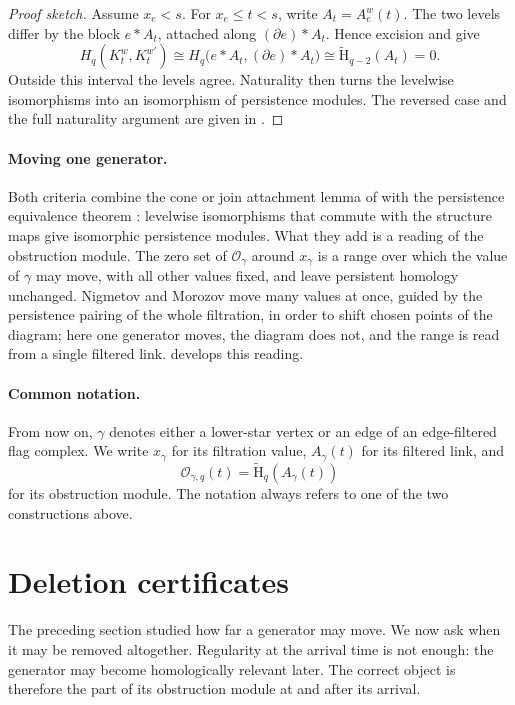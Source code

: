 \documentclass[11pt,letterpaper]{article}
\theoremstyle{definition}
\newcommand{\redH}{\widetilde{\mathrm H}}
\newcommand{\Oc}{\mathcal O}
\begin{document}
\begin{proof}[Proof sketch]
Assume $x_e<s$. For $x_e\leq t<s$, write $A_t=A_e^w(t)$. The two levels
differ by the block $e*A_t$, attached along $(\partial e)*A_t$. Hence
excision and  give
$$
H_q(K_t^w,K_t^{w'})
\cong H_q\bigl(e*A_t,(\partial e)*A_t\bigr)
\cong\redH_{q-2}(A_t)=0.
$$
Outside this interval the levels agree. Naturality then turns the levelwise
isomorphisms into an isomorphism of persistence modules. The reversed case and
the full naturality argument are given in .
\end{proof}

\paragraph{Moving one generator.}
Both criteria combine the cone or join attachment lemma of
 with the persistence equivalence theorem
\cite{EdelsbrunnerHarer2010}: levelwise isomorphisms that commute with the
structure maps give isomorphic persistence modules. What they add is a reading
of the obstruction module. The zero set of $\Oc_\gamma$ around $x_\gamma$ is a
range over which the value of $\gamma$ may move, with all other values fixed,
and leave persistent homology unchanged. Nigmetov and Morozov
\cite{NigmetovMorozov2024} move many values at once, guided by the persistence
pairing of the whole filtration, in order to shift chosen points of the
diagram; here one generator moves, the diagram does not, and the range is read
from a single filtered link.  develops this reading.

\paragraph{Common notation.}
From now on, $\gamma$ denotes either a lower-star vertex or an edge of an
edge-filtered flag complex. We write $x_\gamma$ for its filtration value,
$A_\gamma(t)$ for its filtered link, and
$$
\Oc_{\gamma,q}(t)=\redH_q(A_\gamma(t))
$$
for its obstruction module. The notation always refers to one of the two
constructions above.

\section{Deletion certificates}
\label{sec:certificate}

The preceding section studied how far a generator may move. We now ask when
it may be removed altogether. Regularity at the arrival time is not enough:
the generator may become homologically relevant later. The correct object is
therefore the part of its obstruction module at and after its arrival.
\end{document}
